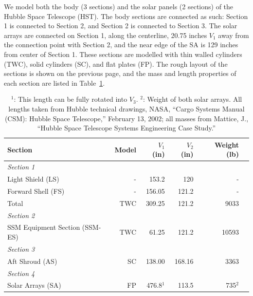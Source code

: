 \documentclass[onecolumn,10pt]{jhwhw}
\begin{document}
We model both the body (3 sections) and the solar panels (2 sections) of the Hubble Space Telescope (HST). The body sections are connected as such: Section 1 is connected to Section 2, and Section 2 is connected to Section 3. The solar arrays are connected on Section 1, along the centerline, 20.75 inches $V_1$ away from the connection point with Section 2, and the near edge of the SA is 129 inches from center of Section 1. These sections are modelled with thin walled cylinders (TWC), solid cylinders (SC), and flat plates (FP). The rough layout of the sections is shown on the previous page, and the mass and length properties of each section are listed in Table~\ref{properties}.

\begin{table}[h!]
\begin{center}
\begin{tabular}{l r r r r r}
\toprule
Section & Model & $V_1$ (in) & $V_2$ (in) & Weight (lb) \\
\midrule
\it{Section 1} & & & & \\
\hspace{1em} Light Shield (LS)   & - & 153.2  & 120  & - \\
\hspace{1em} Forward Shell (FS)  & - & 156.05 & 121.2 & - \\
\hspace{1em} Total  & TWC & 309.25 & 121.2 & 9033 \\
\it{Section 2} & & & & \\
\hspace{1em} SSM Equipment Section (SSM-ES) & TWC &  61.25  &  121.2 & 10593\\
\it{Section 3} & & & & \\
\hspace{1em} Aft Shroud (AS) & SC &  138.00  &  168.16 & 3363\\
\it{Section 4} & & & & \\
\hspace{1em} Solar Arrays (SA) & FP &  476.8$^1$  &  113.5 & 735$^2$\\
\bottomrule
\end{tabular}
\end{center}
\caption{$^1$: This length can be fully rotated into $V_3$. $^2$: Weight of both solar arrays. All lengths taken from Hubble technical drawings,  NASA, ``Cargo Systems Manual (CSM): Hubble Space Telescope,'' February 13, 2002; all masses from Mattice, J., ``Hubble Space Telescope Systems Engineering Case Study.''}
\label{properties}
\end{table}
\end{document}
